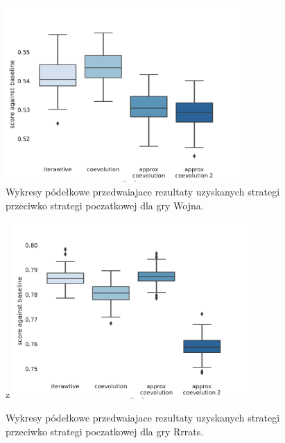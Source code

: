 \documentclass[inzynierska]{pwr_wmat_praca_dyplomowa}
\theoremstyle{plain}
\numberwithin{theorem}{chapter}
\theoremstyle{definition}
\numberwithin{theorem}{chapter}
\begin{document}
	\begin{figure}
		\centering
		\includegraphics[width=0.8\textwidth]{imagens/war_results.pdf}
		\caption{Wykresy pódełkowe przedwaiajace rezultaty uzyskanych strategi przeciwko strategi poczatkowej dla gry Wojna.}
		\label{fig:war_results}
	\end{figure}
	\begin{figure}z
		\centering
		\includegraphics[width=0.8\textwidth]{imagens/rrrats_results.pdf}
		\caption{Wykresy pódełkowe przedwaiajace rezultaty uzyskanych strategi przeciwko strategi poczatkowej dla gry Rrrats.}
		\label{fig:rrrats_results}
	\end{figure}
	
	


	\newpage
\end{document}
